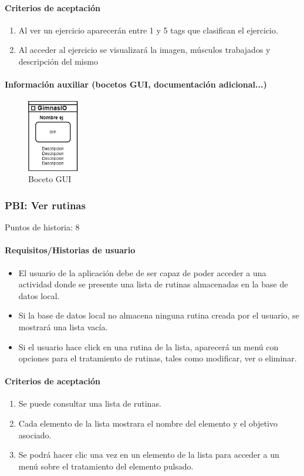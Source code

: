 \documentclass[11pt,a4paper]{report}
\begin{document}
\paragraph{Criterios de aceptación}
\begin{enumerate}
	\item Al ver un ejercicio aparecerán entre 1 y 5 tags que clasifican el ejercicio.
	\item Al acceder al ejercicio se visualizará la imagen, músculos trabajados y descripción del mismo
\end{enumerate}
\paragraph{Información auxiliar (bocetos GUI, documentación adicional...)}
\begin{figure}[H]
	\centering
	\includegraphics[width=0.2\textwidth]{capturicas/guipbiverejer.png}
	\caption{Boceto GUI}
	\label{fig: guipbi3}
\end{figure}
\subsubsection{PBI: Ver rutinas}
Puntos de historia: 8
\paragraph{Requisitos/Historias de usuario}
\begin{itemize}
	\item El usuario de la aplicación debe de ser capaz de poder acceder a una actividad donde se presente una lista de rutinas almacenadas en la base de datos local.
	\item Si la base de datos local no almacena ninguna rutina creada por el usuario, se mostrará una lista vacía.
	\item Si el usuario hace click en una rutina de la lista, aparecerá un menú con opciones para el tratamiento de rutinas, tales como modificar, ver o eliminar.
\end{itemize}
\paragraph{Criterios de aceptación}
\begin{enumerate}
	\item Se puede consultar una lista de rutinas.
	\item Cada elemento de la lista mostrara el nombre del elemento y el objetivo
	asociado.
	\item Se podrá hacer clic una vez en un elemento de la lista para acceder a un menú sobre el tratamiento del elemento pulsado.
\end{enumerate}
\end{document}
